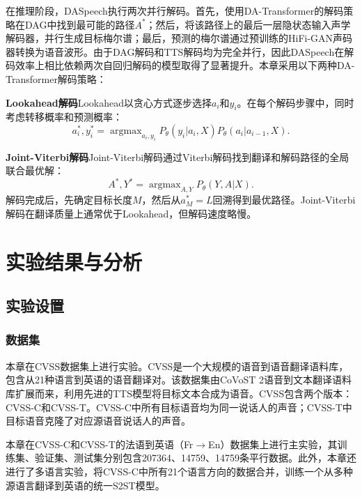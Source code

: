 在推理阶段，DASpeech执行两次并行解码。首先，使用DA-Transformer的解码策略在DAG中找到最可能的路径$A^*$；然后，将该路径上的最后一层隐状态输入声学解码器，并行生成目标梅尔谱；最后，预测的梅尔谱通过预训练的HiFi-GAN声码器\citep{hifigan}转换为语音波形。由于DAG解码和TTS解码均为完全并行，因此DASpeech在解码效率上相比依赖两次自回归解码的模型取得了显著提升。本章采用以下两种DA-Transformer解码策略：

\textbf{Lookahead解码}\quad Lookahead以贪心方式逐步选择$a_i$和$y_i$。在每个解码步骤中，同时考虑转移概率和预测概率：
\begin{equation}
    a_i^*, y_i^* = \mathop{\arg\max}_{a_i, y_i} P_\theta(y_i|a_i, X)P_\theta(a_i | a_{i-1}, X).
\end{equation}

\textbf{Joint-Viterbi解码}\quad Joint-Viterbi解码\citep{shao2022viterbi}通过Viterbi解码\citep{viterbi}找到翻译和解码路径的全局联合最优解：
\begin{equation}
    A^*, Y^* = \mathop{\arg\max}_{A,Y} P_\theta(Y, A | X).
\end{equation}
解码完成后，先确定目标长度$M$，然后从$a^*_M=L$回溯得到最优路径。Joint-Viterbi解码在翻译质量上通常优于Lookahead，但解码速度略慢。


\section{实验结果与分析}

\subsection{实验设置}

\subsubsection{数据集}

本章在CVSS\citep{jia2022cvss}数据集上进行实验。CVSS是一个大规模的语音到语音翻译语料库，包含从21种语言到英语的语音翻译对。该数据集由CoVoST 2\citep{wang2020covost2}语音到文本翻译语料库扩展而来，利用先进的TTS模型将目标文本合成为语音。CVSS包含两个版本：CVSS-C和CVSS-T。CVSS-C中所有目标语音均为同一说话人的声音；CVSS-T中目标语音克隆了对应源语音说话人的声音。

本章在CVSS-C和CVSS-T的法语到英语（Fr$\rightarrow$En）数据集上进行主实验，其训练集、验证集、测试集分别包含207364、14759、14759条平行数据。此外，本章还进行了多语言实验，将CVSS-C中所有21个语言方向的数据合并，训练一个从多种源语言翻译到英语的统一S2ST模型。


